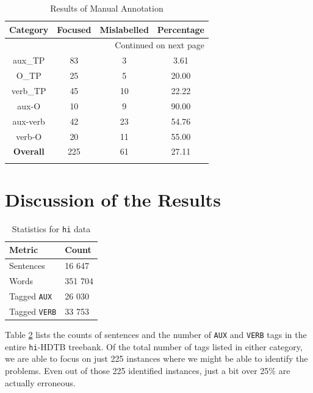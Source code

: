\newpage
\begin{longtable}{|c|c|c|c|}
\hline 
\multicolumn{1}{|l|}{\textbf{Category}} &
\multicolumn{1}{l|}{\textbf{Focused}} &
\multicolumn{1}{l|}{\textbf{Mislabelled}} &
\multicolumn{1}{l|}{\textbf{Percentage}} \\
\hline 
\endhead
\hline 
\multicolumn{4}{|r|}{{Continued on next page}} \\ 
\hline
\endfoot
\endlastfoot
    \hline
    \label{tab:auxverbResults}
    aux\_TP & 83 & 3 & 3.61 \\
    O\_TP & 25 & 5 & 20.00 \\
    verb\_TP & 45 & 10 & 22.22 \\
    \hline
    aux-O & 10 & 9 & 90.00 \\
    aux-verb & 42 & 23 & 54.76 \\
    verb-O & 20 & 11 & 55.00 \\
    \hline
    \hline
    \textbf{Overall} & 225 & 61 & 27.11 \\
    \hline
\caption{Results of Manual Annotation}
\end{longtable}

\section{Discussion of the Results}
\label{ssec:auxverbDiscussion}

\begin{table}[h]
    \centering
    \begin{tabular}{|l|l|}
        \hline
        \textbf{Metric} & \textbf{Count} \\
        \hline
        Sentences & 16 647 \\
        Words & 351 704 \\
        Tagged \verb|AUX| & 26 030 \\
        Tagged \verb|VERB| & 33 753 \\
        \hline
    \end{tabular}
    \caption{Statistics for \texttt{hi} data}
    \label{tab:auxverbDetails}
\end{table}

Table \ref{tab:auxverbDetails} lists the counts of sentences and the number of \verb|AUX| and \verb|VERB| tags in the entire \verb|hi|-HDTB treebank. Of the total number of tags listed in either category, we are able to focus on just 225 instances where we might be able to identify the problems. Even out of those 225 identified instances, just a bit over 25\% are actually erroneous. 


